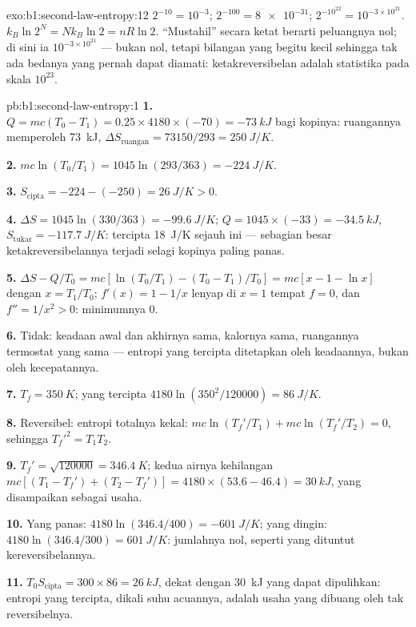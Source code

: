 \begin{solution}{exo:b1:second-law-entropy:12}
$2^{-10} = 10^{-3}$; $2^{-100} = \num{8e-31}$; $2^{-10^{22}} = 10^{-3\times10^{21}}$.
$k_B\ln2^N = Nk_B\ln2 = nR\ln2$. ``Mustahil'' secara ketat berarti peluangnya
nol; di sini ia $10^{-3\times10^{21}}$ --- bukan nol, tetapi bilangan yang begitu kecil sehingga
tak ada bedanya yang pernah dapat diamati: ketakreversibelan adalah statistika pada
skala $10^{23}$.
\end{solution}

\begin{solution}{pb:b1:second-law-entropy:1}
\textbf{1.} $Q = mc(T_0 - T_1) = 0.25 \times 4180 \times (-70) = \qty{-73}{kJ}$
bagi kopinya: ruangannya memperoleh \qty{73}{kJ}, $\Delta S_{\text{ruangan}} = 73150/293
= \qty{+250}{J/K}$.

\textbf{2.} $mc\ln(T_0/T_1) = 1045\ln(293/363) = \qty{-224}{J/K}$.

\textbf{3.} $S_{\mathrm{cipta}} = -224 - (-250) = \qty{+26}{J/K} > 0$.

\textbf{4.} $\Delta S = 1045\ln(330/363) = \qty{-99.6}{J/K}$; $Q = 1045 \times
(-33) = \qty{-34.5}{kJ}$, $S_{\mathrm{tukar}} = \qty{-117.7}{J/K}$: tercipta
\qty{18}{J/K} sejauh ini --- sebagian besar ketakreversibelannya terjadi selagi
kopinya paling panas.

\textbf{5.} $\Delta S - Q/T_0 = mc[\ln(T_0/T_1) - (T_0 - T_1)/T_0] = mc[x - 1 -
\ln x]$ dengan $x = T_1/T_0$; $f'(x) = 1 - 1/x$ lenyap di $x = 1$ tempat
$f = 0$, dan $f'' = 1/x^2 > 0$: minimumnya $0$.

\textbf{6.} Tidak: keadaan awal dan akhirnya sama, kalornya
sama, ruangannya termostat yang sama --- entropi yang tercipta ditetapkan oleh
keadaannya, bukan oleh kecepatannya.

\textbf{7.} $T_f = \qty{350}{K}$; yang tercipta $4180\ln(350^2/120000) = \qty{86}{J/K}$.

\textbf{8.} Reversibel: entropi totalnya kekal: $mc\ln(T_f'/T_1) + mc\ln(T_f'/
T_2) = 0$, sehingga $T_f'^2 = T_1T_2$.

\textbf{9.} $T_f' = \sqrt{120000} = \qty{346.4}{K}$; kedua airnya kehilangan $mc[(T_1 -
T_f') + (T_2 - T_f')] = 4180 \times (53.6 - 46.4) = \qty{30}{kJ}$, yang disampaikan sebagai
usaha.

\textbf{10.} Yang panas: $4180\ln(346.4/400) = \qty{-601}{J/K}$; yang dingin: $4180\ln(346.4/
300) = \qty{+601}{J/K}$: jumlahnya nol, seperti yang dituntut kereversibelannya.

\textbf{11.} $T_0S_{\mathrm{cipta}} = 300 \times 86 = \qty{26}{kJ}$, dekat dengan
\qty{30}{kJ} yang dapat dipulihkan: entropi yang tercipta, dikali suhu
acuannya, adalah usaha yang dibuang oleh  tak reversibelnya.


\end{solution}
